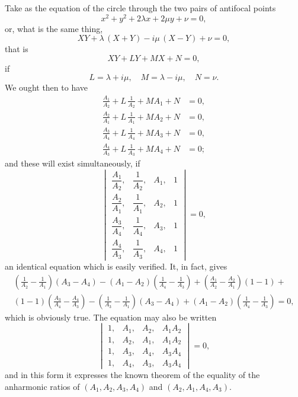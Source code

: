 \documentclass[11pt,a4paper]{article}
\begin{document}
Take as the equation of the circle through the two pairs of antifocal points
\[
x^2 + y^2 + 2\lambda x + 2\mu y + \nu = 0,
\]
or, what is the same thing,
\[
XY + \lambda\,(X+Y) - i\mu\,(X-Y) + \nu = 0,
\]
that is
\[
XY + LY + MX + N = 0,
\]
if
\[
L = \lambda + i\mu, \quad M = \lambda - i\mu, \quad N = \nu.
\]
We ought then to have
\begin{align*}
\frac{A_1}{A_2} + L\,\frac{1}{A_2} + MA_1 + N &= 0,\\
\frac{A_2}{A_1} + L\,\frac{1}{A_1} + MA_2 + N &= 0,\\
\frac{A_3}{A_4} + L\,\frac{1}{A_4} + MA_3 + N &= 0,\\
\frac{A_4}{A_3} + L\,\frac{1}{A_3} + MA_4 + N &= 0;
\end{align*}
and these will exist simultaneously, if
\[
\begin{vmatrix}
\dfrac{A_1}{A_2}, & \dfrac{1}{A_2}, & A_1, & 1 \\[1ex]
\dfrac{A_2}{A_1}, & \dfrac{1}{A_1}, & A_2, & 1 \\[1ex]
\dfrac{A_3}{A_4}, & \dfrac{1}{A_4}, & A_3, & 1 \\[1ex]
\dfrac{A_4}{A_3}, & \dfrac{1}{A_3}, & A_4, & 1
\end{vmatrix} = 0,
\]
an identical equation which is easily verified. It, in fact, gives
\begin{multline*}
\left(\frac{1}{A_2} - \frac{1}{A_1}\right)(A_3 - A_4) - (A_1 - A_2)\left(\frac{1}{A_4} - \frac{1}{A_3}\right) + \left(\frac{A_1}{A_2} - \frac{A_2}{A_1}\right)(1-1) +\\
(1-1)\left(\frac{A_3}{A_4} - \frac{A_4}{A_3}\right) - \left(\frac{1}{A_3} - \frac{1}{A_1}\right)(A_3 - A_4) + (A_1 - A_2)\left(\frac{1}{A_4} - \frac{1}{A_3}\right) = 0,
\end{multline*}
which is obviously true. The equation may also be written
\[
\begin{vmatrix}
1, & A_1, & A_2, & A_1A_2 \\
1, & A_2, & A_1, & A_1A_2 \\
1, & A_3, & A_4, & A_3A_4 \\
1, & A_4, & A_3, & A_3A_4
\end{vmatrix} = 0,
\]
and in this form it expresses the known theorem of the equality of the anharmonic
ratios of $(A_1, A_2, A_3, A_4)$ and $(A_2, A_1, A_4, A_3)$.
\end{document}
